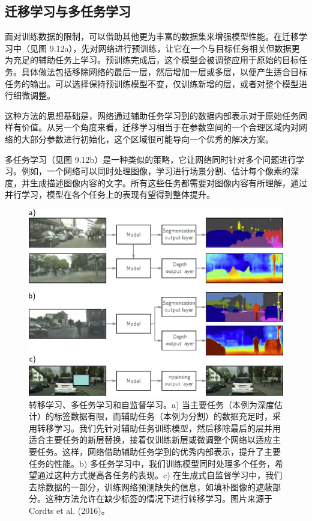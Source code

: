 \documentclass[lang=cn,newtx,10pt,scheme=chinese]{elegantbook}
\begin{document}
\subsection{迁移学习与多任务学习}
面对训练数据的限制，可以借助其他更为丰富的数据集来增强模型性能。在迁移学习中（见图 9.12a），先对网络进行预训练，让它在一个与目标任务相关但数据更为充足的辅助任务上学习。预训练完成后，这个模型会被调整应用于原始的目标任务。具体做法包括移除网络的最后一层，然后增加一层或多层，以便产生适合目标任务的输出。可以选择保持预训练模型不变，仅训练新增的层，或者对整个模型进行细微调整。

这种方法的思想基础是，网络通过辅助任务学习到的数据内部表示对于原始任务同样有价值。从另一个角度来看，迁移学习相当于在参数空间的一个合理区域内对网络的大部分参数进行初始化，这个区域很可能导向一个优秀的解决方案。

多任务学习（见图 9.12b）是一种类似的策略，它让网络同时针对多个问题进行学习。例如，一个网络可以同时处理图像，学习进行场景分割、估计每个像素的深度，并生成描述图像内容的文字。所有这些任务都需要对图像内容有所理解，通过并行学习，模型在各个任务上的表现有望得到整体提升。

\begin{figure}[ht!]
	\centering
	\includegraphics[width=0.7\linewidth]{PDFFigures/UDLChap9PDF/RegTransferMultiC.pdf}
	\caption{转移学习、多任务学习和自监督学习。a) 当主要任务（本例为深度估计）的标签数据有限，而辅助任务（本例为分割）的数据充足时，采用转移学习。我们先针对辅助任务训练模型，然后移除最后的层并用适合主要任务的新层替换，接着仅训练新层或微调整个网络以适应主要任务。这样，网络借助辅助任务学到的优秀内部表示，提升了主要任务的性能。b) 多任务学习中，我们训练模型同时处理多个任务，希望通过这种方式提高各任务的表现。c) 在生成式自监督学习中，我们去除数据的一部分，训练网络预测缺失的信息，如填补图像的遮蔽部分。这种方法允许在缺少标签的情况下进行转移学习。图片来源于 Cordts et al. (2016)。}
\end{figure}
\end{document}
